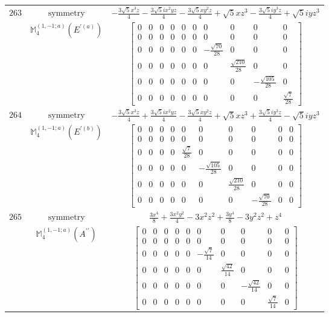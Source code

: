 \documentclass[fleqn,8pt,landscape]{jsarticle}
\begin{document}
\begin{longtable}{ccc}
$ 263 $ & $ \text{symmetry} $ & $ - \frac{3 \sqrt{5} x^{3} z}{4} - \frac{3 \sqrt{5} i x^{2} y z}{4} - \frac{3 \sqrt{5} x y^{2} z}{4} + \sqrt{5} x z^{3} - \frac{3 \sqrt{5} i y^{3} z}{4} + \sqrt{5} i y z^{3} $ \\
$  $ & $ \mathbb{M}_{4}^{(1,-1;a)}(E^{\prime(a)}) $ & $ \begin{bmatrix} 0 & 0 & 0 & 0 & 0 & 0 & 0 & 0 & 0 & 0 \\ 0 & 0 & 0 & 0 & 0 & 0 & 0 & 0 & 0 & 0 \\ 0 & 0 & 0 & 0 & 0 & 0 & - \frac{\sqrt{70}}{28} & 0 & 0 & 0 \\ 0 & 0 & 0 & 0 & 0 & 0 & 0 & \frac{\sqrt{210}}{28} & 0 & 0 \\ 0 & 0 & 0 & 0 & 0 & 0 & 0 & 0 & - \frac{\sqrt{105}}{28} & 0 \\ 0 & 0 & 0 & 0 & 0 & 0 & 0 & 0 & 0 & \frac{\sqrt{7}}{28} \end{bmatrix} $ \\ \hline
$ 264 $ & $ \text{symmetry} $ & $ - \frac{3 \sqrt{5} x^{3} z}{4} + \frac{3 \sqrt{5} i x^{2} y z}{4} - \frac{3 \sqrt{5} x y^{2} z}{4} + \sqrt{5} x z^{3} + \frac{3 \sqrt{5} i y^{3} z}{4} - \sqrt{5} i y z^{3} $ \\
$  $ & $ \mathbb{M}_{4}^{(1,-1;a)}(E^{\prime(b)}) $ & $ \begin{bmatrix} 0 & 0 & 0 & 0 & 0 & 0 & 0 & 0 & 0 & 0 \\ 0 & 0 & 0 & 0 & 0 & 0 & 0 & 0 & 0 & 0 \\ 0 & 0 & 0 & 0 & \frac{\sqrt{7}}{28} & 0 & 0 & 0 & 0 & 0 \\ 0 & 0 & 0 & 0 & 0 & - \frac{\sqrt{105}}{28} & 0 & 0 & 0 & 0 \\ 0 & 0 & 0 & 0 & 0 & 0 & \frac{\sqrt{210}}{28} & 0 & 0 & 0 \\ 0 & 0 & 0 & 0 & 0 & 0 & 0 & - \frac{\sqrt{70}}{28} & 0 & 0 \end{bmatrix} $ \\ \hline
$ 265 $ & $ \text{symmetry} $ & $ \frac{3 x^{4}}{8} + \frac{3 x^{2} y^{2}}{4} - 3 x^{2} z^{2} + \frac{3 y^{4}}{8} - 3 y^{2} z^{2} + z^{4} $ \\
$  $ & $ \mathbb{M}_{4}^{(1,-1;a)}(A^{\prime\prime}) $ & $ \begin{bmatrix} 0 & 0 & 0 & 0 & 0 & 0 & 0 & 0 & 0 & 0 \\ 0 & 0 & 0 & 0 & 0 & 0 & 0 & 0 & 0 & 0 \\ 0 & 0 & 0 & 0 & 0 & - \frac{\sqrt{7}}{14} & 0 & 0 & 0 & 0 \\ 0 & 0 & 0 & 0 & 0 & 0 & \frac{\sqrt{42}}{14} & 0 & 0 & 0 \\ 0 & 0 & 0 & 0 & 0 & 0 & 0 & - \frac{\sqrt{42}}{14} & 0 & 0 \\ 0 & 0 & 0 & 0 & 0 & 0 & 0 & 0 & \frac{\sqrt{7}}{14} & 0 \end{bmatrix} $ \\ \hline

\end{longtable}
\end{document}
